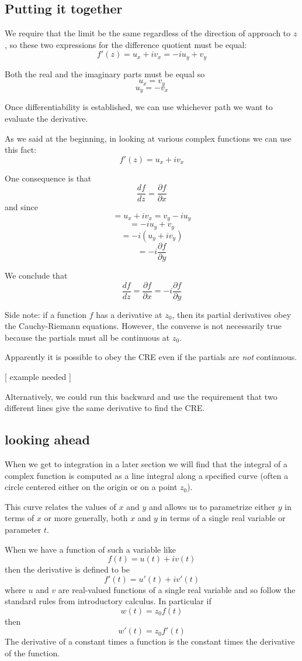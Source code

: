 \documentclass[11pt, oneside]{article}
\begin{document}
\subsection*{Putting it together}
We require that the limit be the same regardless of the direction of approach to $z$, so these two expressions for the difference quotient must be equal:
\[ f'(z) = u_x + i v_x = - i u_y + v_y \]

Both the real and the imaginary parts must be equal so
\[ u_x  = v_y \]
\[ u_y = - v_x \]

Once differentiability is established, we can use whichever path we want to evaluate the derivative.

As we said at the beginning, in looking at various complex functions we can use this fact:
\[ f'(z) = u_x + i v_x \]

One consequence is that
\[ \frac{df}{dz} = \frac{\partial f}{\partial x} \]
and since
\[ = u_x + i v_x = v_y - i u_y \]
\[ = - i u_y + v_y \]
\[ = -i (u_y + i v_y) \]
\[ = -i \frac{\partial f}{\partial y} \]

We conclude that 
\[ \frac{df}{dz} = \frac{\partial f}{\partial x} = -i \frac{\partial f}{\partial y} \]

Side note:  if a function $f$ has a derivative at $z_0$, then its partial derivatives obey the Cauchy-Riemann equations.  However, the converse is not necessarily true because the partials must all be continuous at $z_0$.

Apparently it is possible to obey the CRE even if the partials are \emph{not} continuous.

[ example needed ]

Alternatively, we could run this backward and use the requirement that two different lines give the same derivative to find the CRE.

\subsection*{looking ahead}
When we get to integration in a later section we will find that the integral of a complex function is computed as a line integral along a specified curve (often a circle centered either on the origin or on a point $z_0$).

This curve relates the values of $x$ and $y$ and allows us to parametrize either $y$ in terms of $x$ or more generally, both $x$ and $y$ in terms of a single real variable or parameter $t$.

When we have a function of such a variable like
\[ f(t) = u(t) + i v(t) \]
then the derivative is defined to be
\[ f'(t) = u'(t) + i v'(t) \]
where $u$ and $v$ are real-valued functions of a single real variable and so follow the standard rules from introductory calculus.  In particular if
\[ w(t) = z_0 f(t) \]
then
\[ w'(t) = z_0 f'(t) \]
The derivative of a constant times a function is the constant times the derivative of the function.
\end{document}
